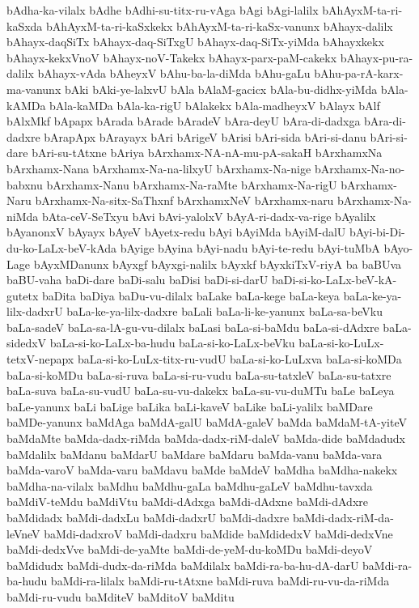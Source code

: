 {bAdha-ka-vilalx
bAdhe
bAdhi-su-titx-ru-vAga
bAgi
bAgi-lalilx
bAhAyxM-ta-ri-kaSxda
bAhAyxM-ta-ri-kaSxkekx
bAhAyxM-ta-ri-kaSx-vanunx
bAhayx-dalilx
bAhayx-daqSiTx
bAhayx-daq-SiTxgU
bAhayx-daq-SiTx-yiMda
bAhayxkekx
bAhayx-kekxVnoV
bAhayx-noV-Takekx
bAhayx-parx-paM-cakekx
bAhayx-pu-ra-dalilx
bAhayx-vAda
bAheyxV
bAhu-ba-la-diMda
bAhu-gaLu
bAhu-pa-rA-karx-ma-vanunx
bAki
bAki-ye-lalxvU
bAla
bAlaM-gacicx
bAla-bu-didhx-yiMda
bAla-kAMDa
bAla-kaMDa
bAla-ka-rigU
bAlakekx
bAla-madheyxV
bAlayx
bAlf
bAlxMkf
bApapx
bArada
bArade
bAradeV
bAra-deyU
bAra-di-dadxga
bAra-di-dadxre
bArapApx
bArayayx
bAri
bArigeV
bArisi
bAri-sida
bAri-si-danu
bAri-si-dare
bAri-su-tAtxne
bAriya
bArxhamx-NA-nA-mu-pA-sakaH
bArxhamxNa
bArxhamx-Nana
bArxhamx-Na-na-lilxyU
bArxhamx-Na-nige
bArxhamx-Na-no-babxnu
bArxhamx-Nanu
bArxhamx-Na-raMte
bArxhamx-Na-rigU
bArxhamx-Naru
bArxhamx-Na-sitx-SaThxnf
bArxhamxNeV
bArxhamx-naru
bArxhamx-‌Na-niMda
bAta-ceV-SeTxyu
bAvi
bAvi-yalolxV
bAyA-ri-dadx-va-rige
bAyalilx
bAyanonxV
bAyayx
bAyeV
bAyetx-redu
bAyi
bAyiMda
bAyiM-dalU
bAyi-bi-Di-du-ko-LaLx-beV-kAda
bAyige
bAyina
bAyi-nadu
bAyi-te-redu
bAyi-tuMbA
bAyo-Lage
bAyxMDanunx
bAyxgf
bAyxgi-nalilx
bAyxkf
bAyxkiTxV-riyA
ba
baBUva
baBU-vaha
baDi-dare
baDi-salu
baDisi
baDi-si-darU
baDi-si-ko-LaLx-beV-kA-gutetx
baDita
baDiya
baDu-vu-dilalx
baLake
baLa-kege
baLa-keya
baLa-ke-ya-lilx-dadxrU
baLa-ke-ya-lilx-dadxre
baLali
baLa-li-ke-yanunx
baLa-sa-beVku
baLa-sadeV
baLa-sa-lA-gu-vu-dilalx
baLasi
baLa-si-baMdu
baLa-si-dAdxre
baLa-sidedxV
baLa-si-ko-LaLx-ba-hudu
baLa-si-ko-LaLx-beVku
baLa-si-ko-LuLx-tetxV-nepapx
baLa-si-ko-LuLx-titx-ru-vudU
baLa-si-ko-LuLxva
baLa-si-koMDa
baLa-si-koMDu
baLa-si-ruva
baLa-si-ru-vudu
baLa-su-tatxleV
baLa-su-tatxre
baLa-suva
baLa-su-vudU
baLa-su-vu-dakekx
baLa-su-vu-duMTu
baLe
baLeya
baLe-yanunx
baLi
baLige
baLika
baLi-kaveV
baLike
baLi-yalilx
baMDare
baMDe-yanunx
baMdAga
baMdA-galU
baMdA-galeV
baMda
baMdaM-tA-yiteV
baMdaMte
baMda-dadx-riMda
baMda-dadx-riM-daleV
baMda-dide
baMdadudx
baMdalilx
baMdanu
baMdarU
baMdare
baMdaru
baMda-vanu
baMda-vara
baMda-varoV
baMda-varu
baMdavu
baMde
baMdeV
baMdha
baMdha-nakekx
baMdha-na-vilalx
baMdhu
baMdhu-gaLa
baMdhu-gaLeV
baMdhu-tavxda
baMdiV-teMdu
baMdiVtu
baMdi-dAdxga
baMdi-dAdxne
baMdi-dAdxre
baMdidadx
baMdi-dadxLu
baMdi-dadxrU
baMdi-dadxre
baMdi-dadx-riM-da-leVneV
baMdi-dadxroV
baMdi-dadxru
baMdide
baMdidedxV
baMdi-dedxVne
baMdi-dedxVve
baMdi-de-yaMte
baMdi-de-yeM-du-koMDu
baMdi-deyoV
baMdidudx
baMdi-dudx-da-riMda
baMdilalx
baMdi-ra-ba-hu-dA-darU
baMdi-ra-ba-hudu
baMdi-ra-lilalx
baMdi-ru-tAtxne
baMdi-ruva
baMdi-ru-vu-da-riMda
baMdi-ru-vudu
baMditeV
baMditoV
baMditu
}
